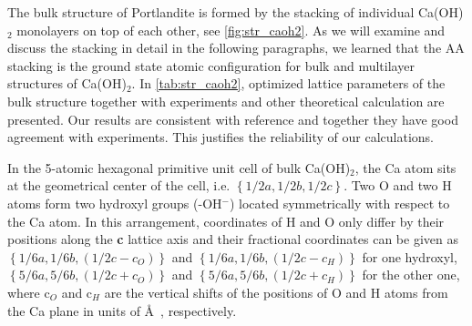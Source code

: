 The bulk structure of Portlandite is formed by the stacking of individual Ca(OH)$_2$ monolayers on top of each other, see \autoref{fig:str_caoh2}. As we will examine and discuss the stacking in detail in the following paragraphs, we learned that the AA stacking is the ground state atomic configuration for bulk and multilayer structures of Ca(OH)$_2$. In \autoref{tab:str_caoh2}, optimized lattice parameters of the bulk structure together with experiments and other theoretical calculation are presented. Our results are consistent with reference \cite{Pishtshev} and together they have good agreement with experiments. This justifies the reliability of our calculations. 

In the 5-atomic hexagonal primitive unit cell of bulk Ca(OH)$_2$, the Ca atom sits at the geometrical
center of the cell, i.e. $\left\lbrace 1/2a, 1/2b,
1/2c \right\rbrace$. Two O and two H atoms form two hydroxyl groups 
(-OH$^-$) located symmetrically with respect to the Ca atom. In this 
arrangement, coordinates of H and O only differ by their positions along the 
\textbf{c} lattice axis and their fractional coordinates can be given as
$\left\lbrace1/6a, 1/6b, (1/2c-c_O) \right\rbrace$ and $\left\lbrace 
1/6a, 1/6b, (1/2c-c_H) \right\rbrace$ for one hydroxyl,
$\left\lbrace 5/6a, 5/6b, (1/2c+c_O) \right\rbrace$
and $\left\lbrace 5/6a, 5/6b, (1/2c+c_H)
\right\rbrace$ for the other one, where c$_O$ and c$_H$ are the vertical shifts
of the positions of O and H atoms from the Ca plane in units of \AA~, respectively. 

